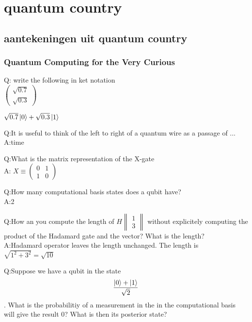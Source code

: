 \documentclass[../../main.tex]{subfiles}
\begin{document}
\onlyinsubfile{
\setcounter{chapter}{8}
}
\notinsubfile{}
\chapter{quantum country}
\onlyinsubfile{
\marginpar{\vspace{0cm}
\textcolor{red}{ hoofdstuk is los gecompileerd, hstk nummer is \thechapter}
}
}
\notinsubfile{
\marginpar{\vspace{0cm}
\textcolor{red}{main.tex gecompileerd, nummering zou moeten kloppen}}
}
\section*{aantekeningen uit quantum country}

\subsection*{Quantum Computing for the Very Curious}

Q: write the following in ket notation\\
$\begin{pmatrix}
\sqrt{0.7}\\
\sqrt{0.3}
\end{pmatrix}
$

$\sqrt{0.7} \ket{0}+\sqrt{0.3}\ket{1}$


Q:It is useful to think of the left to right of a quantum wire as a passage of ...
\\
A:time

Q:What is the matrix representation of the X-gate\\
A:
$X \equiv \begin{pmatrix}
0&1\\
1&0
\end{pmatrix}
$

Q:How many computational basis states does a qubit have?\\
A:2

Q:How an you compute the length of
$H\begin{Vmatrix}
1\\
3
\end{Vmatrix}
$
without explicitely computing the product of the Hadamard gate and the vector?
What is the length?\\

A:Hadamard operator leaves the length unchanged. The length is $\sqrt{1^2+3^2}=\sqrt{10}$

Q:Suppose we have a qubit in the state
$$\frac{\ket{0}+\ket{1}}{\sqrt{2}}$$. What is the probabilitiy of a measurement in the in the computational basis will give the result 0? What is then its posterior state? 
\end{document}
